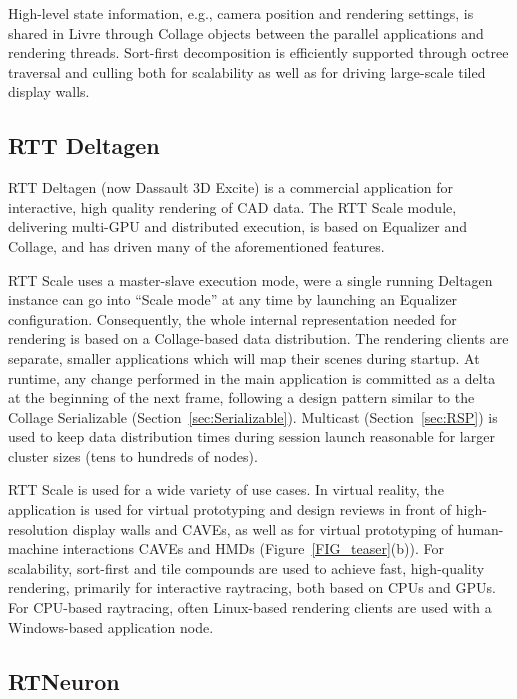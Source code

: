 \documentclass[10pt,journal,compsoc]{IEEEtran}
\newcommand{\sref}[1]{Section~\ref{#1}}
\newcommand{\fig}[1]{Figure~\ref{#1}}
\begin{document}
High-level state information, e.g., camera position and rendering settings, is shared in Livre
through \textsf{Collage} objects between the parallel applications and rendering threads.
Sort-first decomposition is efficiently supported through octree traversal and culling both
for scalability as well as for driving large-scale tiled display walls.

\subsection{RTT Deltagen}

RTT Deltagen (now Dassault 3D Excite) is a commercial application for
interactive, high quality rendering of CAD data. The RTT Scale module,
delivering multi-GPU and distributed execution, is based on \textsf{Equalizer}
and \textsf{Collage}, and has driven many of the aforementioned features.

RTT Scale uses a master-slave execution mode, were a single running Deltagen
instance can go into ``Scale mode'' at any time by launching an
\textsf{Equalizer} configuration. Consequently, the whole internal
representation needed for rendering is based on a \textsf{Collage}-based data
distribution. The rendering clients are separate, smaller applications which
will map their scenes during startup. At runtime, any change performed in the
main application is committed as a delta at the beginning of the next frame,
following a design pattern similar to the \textsf{Collage Serializable}
(\sref{sec:Serializable}). Multicast (\sref{sec:RSP}) is used to keep data
distribution times during session launch reasonable for larger cluster sizes
(tens to hundreds of nodes).

RTT Scale is used for a wide variety of use cases. In virtual reality, the
application is used for virtual prototyping and design reviews in front of
high-resolution display walls and CAVEs, as well as for virtual prototyping of
human-machine interactions CAVEs and HMDs (\fig{FIG_teaser}(b)). For
scalability, sort-first and tile compounds are used to achieve fast,
high-quality rendering, primarily for interactive raytracing, both based on CPUs
and GPUs. For CPU-based raytracing, often Linux-based rendering clients are used
with a Windows-based application node.

\subsection{RTNeuron}
\end{document}
